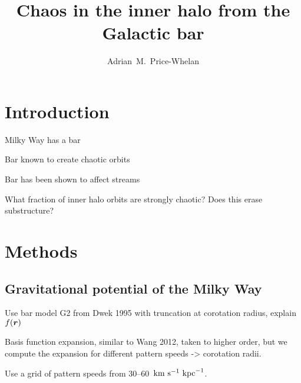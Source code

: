 \documentclass[modern]{aastex61}
\begin{document}
\sloppy\sloppypar\raggedbottom\frenchspacing %

\title{Chaos in the inner halo from the Galactic bar}

\author[0000-0003-0872-7098]{Adrian~M.~Price-Whelan}



\begin{abstract}
\end{abstract}


\section{Introduction} \label{sec:intro}

Milky Way has a bar

Bar known to create chaotic orbits

Bar has been shown to affect streams

What fraction of inner halo orbits are strongly chaotic?
Does this erase substructure?

\section{Methods} \label{sec:methods}

\subsection{Gravitational potential of the Milky Way} \label{sec:potential}

Use bar model G2 from Dwek 1995 with truncation at corotation radius,
explain $f(\boldsymbol{r})$

Basis function expansion, similar to Wang 2012, taken to higher order, but we
compute the expansion for different pattern speeds -> corotation radii.

Use a grid of pattern speeds from 30--60~$\mathrm{km}~\mathrm{s}^{-1}~\mathrm{kpc}^{-1}$.
\end{document}
